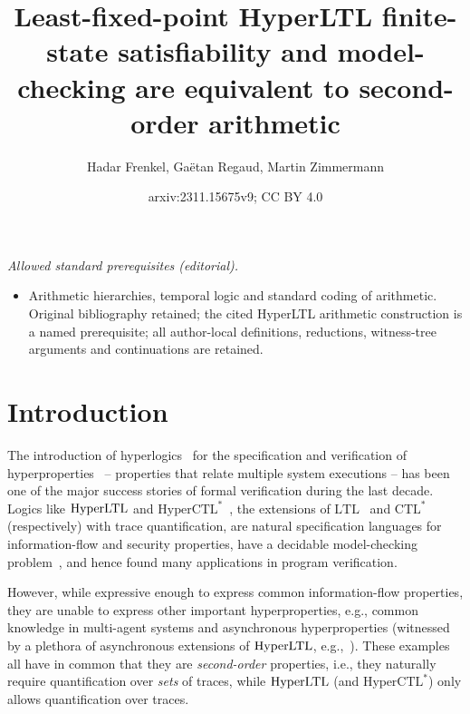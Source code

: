 \documentclass[dvipsnames,10pt,a4paper]{amsart}
\title{Least-fixed-point HyperLTL finite-state satisfiability and model-checking are equivalent to second-order arithmetic}
\author{Hadar Frenkel, Gaëtan Regaud, Martin Zimmermann}
\date{arxiv:2311.15675v9; CC BY 4.0}
\theoremstyle{definition}
\theoremstyle{remark}
\newcommand{\ltl}{\mathrm{LTL}\xspace}
\newcommand{\ctlstar}{\mathrm{CTL^*}\xspace}
\newcommand{\hyltl}{\mathrm{Hyper\-LTL}\xspace}
\newcommand{\hyctlstar}{\mathrm{HyperCTL^*}\xspace}
\begin{document}
\maketitle
\noindent\textit{Allowed standard prerequisites (editorial).}\begin{itemize}
\item Arithmetic hierarchies, temporal logic and standard coding of arithmetic. Original bibliography retained; the cited HyperLTL arithmetic construction is a named prerequisite; all author-local definitions, reductions, witness-tree arguments and continuations are retained.
\end{itemize}\medskip

\section{Introduction}
\label{sec:intro}

The introduction of hyperlogics~\cite{ClarksonFKMRS14} for the specification and verification of hyperproperties~\cite{ClarksonS10} -- properties that relate multiple system executions -- has been one of the major success stories of formal verification during the last decade.
Logics like $\hyltl$ and $\hyctlstar$~\cite{ClarksonFKMRS14}, the extensions of $\ltl$~\cite{Pnueli77} 
and $\ctlstar$~\cite{EmersonH86} (respectively) with trace quantification, are natural specification languages for information-flow and security properties, have a decidable model-checking problem~\cite{FinkbeinerRS15}, and hence found many applications in program verification.

However, while expressive enough to express common information-flow properties, they are unable to express other important hyperproperties, e.g., common knowledge in multi-agent systems and asynchronous hyperproperties (witnessed by a plethora of asynchronous extensions of $\hyltl$, e.g.,~\cite{BartocciHNC23,DBLP:conf/cav/BaumeisterCBFS21,BeutnerF23,DBLP:journals/corr/abs-2404-16778,DBLP:conf/lics/BozzelliPS21,DBLP:conf/concur/BozzelliPS22,DBLP:journals/pacmpl/GutsfeldMO21,DBLP:conf/mfcs/KontinenSV23,KontinenSV24,DBLP:conf/mfcs/KrebsMV018}).
These examples all have in common that they are \emph{second-order} properties, i.e., they naturally require quantification over \emph{sets} of traces, while $\hyltl$ (and $\hyctlstar$) only allows quantification over traces.
\end{document}
